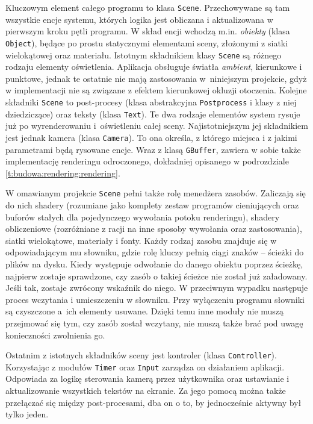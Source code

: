 	Kluczowym element całego programu to klasa \texttt{Scene}. Przechowywane są tam wszystkie encje systemu, których logika jest obliczana i aktualizowana w pierwszym kroku pętli programu. W skład encji wchodzą m.in. \emph{obiekty} (klasa \texttt{Object}), będące po prostu statycznymi elementami sceny, złożonymi z siatki wielokątowej oraz materiału. Istotnym składnikiem klasy \texttt{Scene} są różnego rodzaju elementy oświetlenia. Aplikacja obsługuje światła \emph{ambient}, kierunkowe i punktowe, jednak te ostatnie nie mają zastosowania w~niniejszym projekcie, gdyż w implementacji nie są związane z efektem kierunkowej okluzji otoczenia. Kolejne składniki \texttt{Scene} to post-procesy (klasa abstrakcyjna \texttt{Postprocess} i klasy z niej dziedziczące) oraz teksty (klasa \texttt{Text}). Te dwa rodzaje elementów system rysuje już po wyrenderowaniu i~oświetleniu całej sceny. Najistotniejszym jej składnikiem jest jednak kamera (klasa \texttt{Camera}). To ona określa, z którego miejsca i z jakimi parametrami będą rysowane encje. Wraz z klasą \texttt{GBuffer}, zawiera w sobie także implementację renderingu odroczonego, dokładniej opisanego w podrozdziale \ref{t:budowa:rendering:rendering}.
	
	W omawianym projekcie \texttt{Scene} pełni także rolę menedżera zasobów. Zaliczają się do nich shadery (rozumiane jako komplety zestaw programów cieniujących oraz buforów stałych dla pojedynczego wywołania potoku renderingu), shadery obliczeniowe (rozróżniane z racji na inne sposoby wywołania oraz zastosowania), siatki wielokątowe, materiały i fonty. Każdy rodzaj zasobu znajduje się w odpowiadającym mu słowniku, gdzie rolę kluczy pełnią ciągi znaków -- ścieżki do plików na dysku. Kiedy występuje odwołanie do danego obiektu poprzez ścieżkę, najpierw zostaje sprawdzone, czy zasób o takiej ścieżce nie został już załadowany. Jeśli tak, zostaje zwrócony wskaźnik do niego. W przeciwnym wypadku następuje proces wczytania i umieszczeniu w słowniku. Przy wyłączeniu programu słowniki są czyszczone a~ich elementy usuwane. Dzięki temu inne moduły nie muszą przejmować się tym, czy zasób został wczytany, nie muszą także brać pod uwagę konieczności zwolnienia go.
	
	Ostatnim z istotnych składników sceny jest kontroler (klasa \texttt{Controller}). Korzystając z modułów \texttt{Timer} oraz \texttt{Input} zarządza on działaniem aplikacji. Odpowiada za logikę sterowania kamerą przez użytkownika oraz ustawianie i aktualizowanie wszystkich tekstów na ekranie. Za jego pomocą można także przełączać się między post-procesami, dba on o to, by jednocześnie aktywny był tylko jeden.
	
